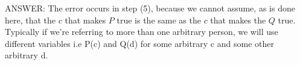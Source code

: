 \documentclass[12pt]{article}
\newenvironment{answer}{\fontfamily{ptm}\selectfont \smaller[1] ANSWER: }{}
\begin{document}
\begin{enumerate}
\begin{answer}
	The error occurs in step (5), because we cannot assume, as is done here, that the $c$ that makes $P$ true is the same as the $c$ that makes the $Q$ true. Typically if we're referring to more than one arbitrary person, we will use different variables i.e P(c) and Q(d) for some arbitrary c and some other arbitrary d.
\end{answer}

\end{enumerate} %
\end{document}
